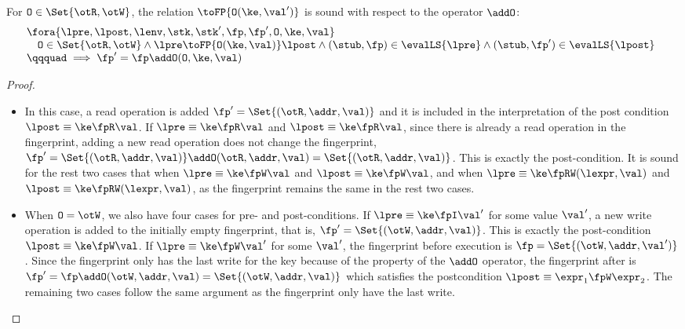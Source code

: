 \begin{lemma}
\label{lem:fingerprint-op}
\label{lem:appendix-fingerprint-op}
For \( \mathtt{O} \in \Set{\otR, \otW} \), the relation \( \toFP{\mathtt{O}(\ke,\val')}\) is sound with respect to the operator \( \addO \):
\[
\begin{array}{@{}l}
    \fora{\lpre, \lpost, \lenv, \stk, \stk', \fp, \fp', \mathtt{O}, \ke, \val} \\
    \quad \mathtt{O} \in \Set{\otR, \otW} 
    \land \lpre \toFP{\mathtt{O}(\ke,\val)} \lpost
    \land (\stub, \fp) \in \evalLS{\lpre}
    \land (\stub, \fp') \in \evalLS{\lpost} \\
    \qqquad \implies \fp' = \fp \addO (\mathtt{O}, \ke, \val)
\end{array}
\]
\end{lemma}
\begin{proof}
\begin{itemize}
    \item In this case, a read operation is added \( \fp' = \Set{(\otR, \addr, \val)} \) and it is included in the interpretation of the post condition \( \lpost \equiv \ke \fpR \val \).
If \( \lpre \equiv \ke \fpR \val \) and \( \lpost \equiv \ke \fpR \val \), 
since there is already a read operation in the fingerprint, adding a new read operation does not change the fingerprint, \ie \( \fp' = \Set{(\otR, \addr, \val)} \addO (\otR, \addr, \val ) = \Set{(\otR, \addr, \val)} \).
This is exactly the post-condition.
It is sound for the rest two cases that  when \( \lpre \equiv \ke \fpW \val \) and \( \lpost \equiv \ke \fpW \val \), and when \( \lpre \equiv \ke \fpRW (\lexpr,\val) \) and \( \lpost \equiv \ke \fpRW (\lexpr,\val) \), as the fingerprint remains the same in the rest two cases.

\item When \( \mathtt{O} = \otW\), we also have four cases for pre- and post-conditions.
If \( \lpre \equiv \ke \fpI \val' \) for some value \( \val' \), a new write operation is added to the initially empty fingerprint, that is, \( \fp' = \Set{(\otW, \addr, \val)}\).
This is exactly the post-condition \( \lpost \equiv \ke \fpW \val \).
If \( \lpre \equiv \ke \fpW \val' \) for some \( \val' \), the fingerprint before execution is \( \fp = \Set{(\otW, \addr, \val')}\).
Since the fingerprint only has the last write for the key because of the property of the \( \addO \) operator,
the fingerprint after is \( \fp' = \fp \addO (\otW, \addr, \val) = \Set{(\otW, \addr, \val)}\) which satisfies the postcondition \( \lpost \equiv \expr_{1} \fpW \expr_{2} \).
The remaining two cases follow the same argument as the fingerprint only have the last write.
\end{itemize}
\end{proof}
